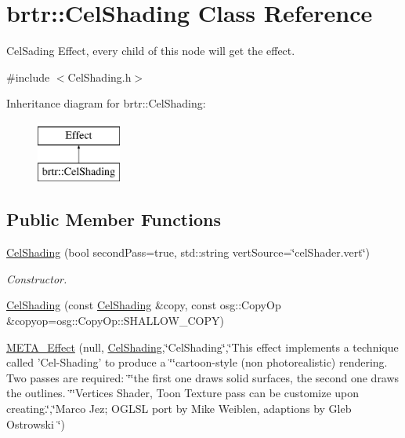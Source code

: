 \hypertarget{classbrtr_1_1_cel_shading}{\section{brtr\+:\+:Cel\+Shading Class Reference}
\label{classbrtr_1_1_cel_shading}
}


Cel\+Sading Effect, every child of this node will get the effect.  




{\ttfamily \#include $<$Cel\+Shading.\+h$>$}

Inheritance diagram for brtr\+:\+:Cel\+Shading\+:\begin{figure}[H]
\begin{center}
\leavevmode
\includegraphics[height=2.000000cm]{classbrtr_1_1_cel_shading}
\end{center}
\end{figure}
\subsection*{Public Member Functions}
\begin{DoxyCompactItemize}
\item 
\hyperlink{classbrtr_1_1_cel_shading_ae497a14c2c379b608643d8f39d156b52}{Cel\+Shading} (bool second\+Pass=true, std\+::string vert\+Source=\char`\"{}cel\+Shader.\+vert\char`\"{})
\begin{DoxyCompactList}\small\item\em Constructor. \end{DoxyCompactList}\item 
\hyperlink{classbrtr_1_1_cel_shading_affb65fcbb6ffe405f60b840c52cdc26c}{Cel\+Shading} (const \hyperlink{classbrtr_1_1_cel_shading}{Cel\+Shading} \&copy, const osg\+::\+Copy\+Op \&copyop=osg\+::\+Copy\+Op\+::\+S\+H\+A\+L\+L\+O\+W\+\_\+\+C\+O\+P\+Y)
\item 
\hyperlink{classbrtr_1_1_cel_shading_a02ab424cf06935b9560b5c39d733d02c}{M\+E\+T\+A\+\_\+\+Effect} (null, \hyperlink{classbrtr_1_1_cel_shading}{Cel\+Shading},\char`\"{}Cel\+Shading\char`\"{},\char`\"{}This effect implements a technique called 'Cel-\/Shading' to produce a \char`\"{}\char`\"{}cartoon-\/style (non photorealistic) rendering. Two passes are required\+: \char`\"{}\char`\"{}the first one draws solid surfaces, the second one draws the outlines. \char`\"{}\char`\"{}Vertices Shader, Toon Texture pass can be customize upon creating.\char`\"{},\char`\"{}Marco Jez; O\+G\+L\+S\+L port by Mike Weiblen, adaptions by Gleb Ostrowski \char`\"{})
\end{DoxyCompactItemize}
